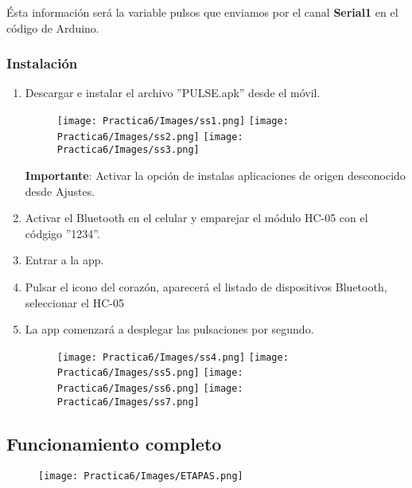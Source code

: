 \documentclass[12pt]{article}
\begin{document}
    Ésta información será la variable pulsos que enviamos por el canal \textbf{Serial1} en el código de Arduino.
    \newpage
    \subsubsection{Instalación}
    
    \begin{enumerate}
        \item Descargar e instalar el archivo ''PULSE.apk'' desde el móvil.
        \begin{figure}[h!]
                \centering
             \texttt{[image: Practica6/Images/ss1.png]}
             \texttt{[image: Practica6/Images/ss2.png]}
             \texttt{[image: Practica6/Images/ss3.png]}
        \end{figure}
    
    \textbf{Importante}: Activar la opción de instalas aplicaciones de origen desconocido desde Ajustes.
        \item Activar el Bluetooth en el celular y emparejar el módulo HC-05 con el códgigo ''1234''.
        \item Entrar a la app.
        \item Pulsar el icono del corazón, aparecerá el listado de dispositivos Bluetooth, seleccionar el HC-05
        \item La app comenzará a desplegar las pulsaciones por segundo.
        
        \begin{figure}[h!]
                \centering
             \texttt{[image: Practica6/Images/ss4.png]}
             \texttt{[image: Practica6/Images/ss5.png]}
             \texttt{[image: Practica6/Images/ss6.png]}
             \texttt{[image: Practica6/Images/ss7.png]}
        \end{figure}
        
    \end{enumerate}
    
    \newpage
    \subsection{Funcionamiento completo}
    \begin{figure}[h!]
                \centering
             \texttt{[image: Practica6/Images/ETAPAS.png]}
    \end{figure}
    
\end{document}
